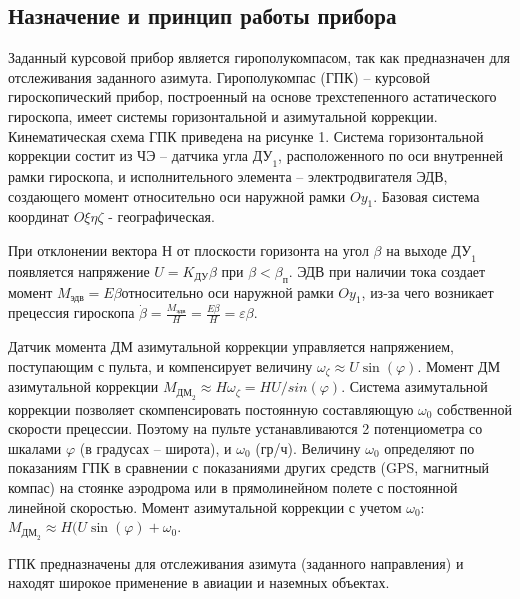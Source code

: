 \documentclass[main.tex]{subfiles}
\begin{document}
\subsection{Назначение и принцип работы прибора}
Заданный курсовой прибор является гирополукомпасом, так как предназначен для отслеживания 
заданного азимута. Гирополукомпас (ГПК) – курсовой гироскопический прибор, построенный 
на основе трехстепенного астатического гироскопа, имеет системы горизонтальной и 
азимутальной коррекции. Кинематическая схема ГПК приведена на рисунке 1. Система 
горизонтальной коррекции состит из ЧЭ – датчика угла \( \text{ДУ}_1 \), расположенного по оси 
внутренней рамки гироскопа, и исполнительного элемента – электродвигателя ЭДВ, 
создающего момент относительно оси наружной рамки \( Oy_1 \). Базовая система 
координат \( O\xi\eta\zeta \) - географическая.\par

При отклонении вектора Н от плоскости горизонта на угол \( \beta \) на выходе \( \text{ДУ}_1 \)
 появляется напряжение \( U=K_\text{ДУ}\beta \) при \( \beta < \beta_\text{п} \). 
 ЭДВ при наличии тока создает момент \( M_\text{эдв}=E\beta \)относительно оси 
 наружной рамки \( Oy_1 \), из-за чего возникает прецессия гироскопа 
 \( \dot{\beta}=\frac{M_\text{эдв}}{H} = \frac{E\beta}{H} = \varepsilon\beta \). \par

Датчик момента ДМ азимутальной коррекции управляется напряжением, поступающим 
с пульта, и компенсирует величину \( \omega_\zeta \approx U\sin(\varphi) \). Момент ДМ
азимутальной коррекции \( M_{\text{ДМ}_2} \approx H\omega_\zeta = HU/sin(\varphi)\).
 Система азимутальной коррекции позволяет скомпенсировать постоянную 
 составляющую \( \omega_0 \) собственной скорости прецессии. Поэтому на пульте
  устанавливаются 2 потенциометра со шкалами \( \varphi \) (в градусах – широта), и 
  \( \omega_0 \) (гр/ч). Величину \( \omega_0 \) определяют по показаниям ГПК в сравнении
   с показаниями других средств (GPS, магнитный компас) на стоянке аэродрома 
   или в прямолинейном полете с постоянной линейной скоростью. Момент азимутальной 
   коррекции с учетом \( \omega_0 \): \( M_{\text{ДМ}_2} \approx H(U\sin(\varphi) + \omega_0 \). \par

ГПК предназначены для отслеживания азимута (заданного направления) и находят 
широкое применение в авиации и наземных объектах.

\newcommand{\Mdd}{M_\text{ДД}}
\newcommand{\Koc}{K_\text{ОС}}
\newcommand{\Ad}{A_\text{д}}
\newcommand{\ad}{\alpha_\text{д}}
\end{document}
